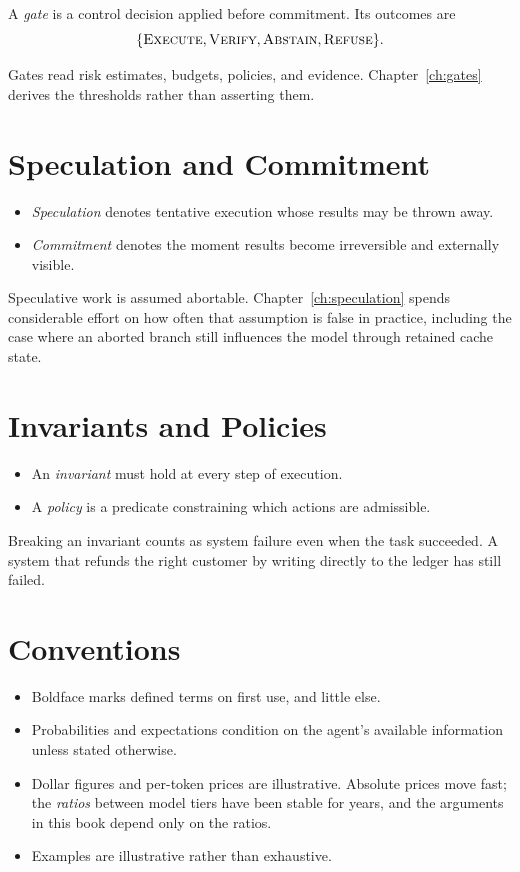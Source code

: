A \emph{gate} is a control decision applied before commitment. Its outcomes are
\[
\{\textsc{Execute}, \textsc{Verify}, \textsc{Abstain}, \textsc{Refuse}\}.
\]

Gates read risk estimates, budgets, policies, and evidence. Chapter~\ref{ch:gates}
derives the thresholds rather than asserting them.

\section*{Speculation and Commitment}

\begin{itemize}
\item \emph{Speculation} denotes tentative execution whose results may be thrown away.
\item \emph{Commitment} denotes the moment results become irreversible and externally visible.
\end{itemize}

Speculative work is assumed abortable. Chapter~\ref{ch:speculation} spends
considerable effort on how often that assumption is false in practice, including
the case where an aborted branch still influences the model through retained
cache state.

\section*{Invariants and Policies}

\begin{itemize}
\item An \emph{invariant} must hold at every step of execution.
\item A \emph{policy} is a predicate constraining which actions are admissible.
\end{itemize}

Breaking an invariant counts as system failure even when the task succeeded.
A system that refunds the right customer by writing directly to the ledger has
still failed.

\section*{Conventions}

\begin{itemize}
\item Boldface marks defined terms on first use, and little else.
\item Probabilities and expectations condition on the agent's available
information unless stated otherwise.
\item Dollar figures and per-token prices are illustrative. Absolute prices move
fast; the \emph{ratios} between model tiers have been stable for years, and the
arguments in this book depend only on the ratios.
\item Examples are illustrative rather than exhaustive.
\end{itemize}

\tableofcontents

\mainmatter
